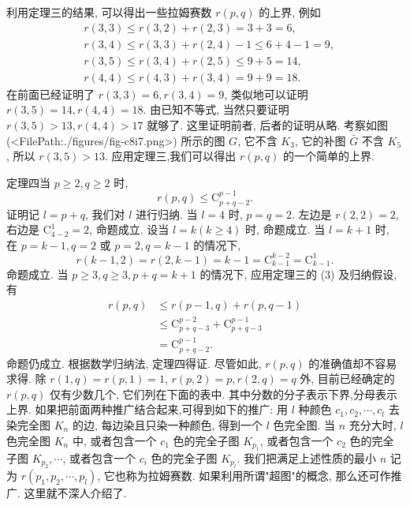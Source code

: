 利用定理三的结果, 可以得出一些拉姆赛数 $r(p, q)$ 的上界, 例如
$$
\begin{aligned}
& r(3,3) \leqslant r(3,2)+r(2,3)=3+3=6, \\
& r(3,4) \leqslant r(3,3)+r(2,4)-1 \leqslant 6+4-1=9, \\
& r(3,5) \leqslant r(3,4)+r(2,5) \leqslant 9+5=14, \\
& r(4,4) \leqslant r(4,3)+r(3,4)=9+9=18 .
\end{aligned}
$$
在前面已经证明了 $r(3,3)=6, r(3,4)=9$, 类似地可以证明 $r(3,5)=14, r(4,4)=18$. 由已知不等式, 当然只要证明 $r(3,5)>13, r(4,4)>17$ 就够了.
这里证明前者, 后者的证明从略.
考察如图(<FilePath:./figures/fig-c8i7.png>) 所示的图 $G$, 它不含 $K_3$, 它的补图 $\bar{G}$ 不含 $K_5$, 所以 $r(3,5)>13$.
应用定理三,我们可以得出 $r(p, q)$ 的一个简单的上界.



定理四当 $p \geqslant 2, q \geqslant 2$ 时,
$$
r(p, q) \leqslant \mathrm{C}_{p+q-2}^{p-1} .
$$
证明记 $l=p+q$, 我们对 $l$ 进行归纳.
当 $l=4$ 时, $p=q=2$. 左边是 $r(2,2)=2$, 右边是 $\mathrm{C}_{4-2}^1=2$, 命题成立.
设当 $l=k(k \geqslant 4)$ 时, 命题成立.
当 $l=k+1$ 时, 在 $p=k-1, q=2$ 或 $p=2, q=k-1$ 的情况下,
$$
r(k-1,2)=r(2, k-1)=k-1=\mathrm{C}_{k-1}^{k-2}=\mathrm{C}_{k-1}^1 .
$$
命题成立.
当 $p \geqslant 3, q \geqslant 3, p+q=k+1$ 的情况下, 应用定理三的 (3) 及归纳假设,有
$$
\begin{aligned}
r(p, q) & \leqslant r(p-1, q)+r(p, q-1) \\
& \leqslant \mathrm{C}_{p+q-3}^{p-2}+\mathrm{C}_{p+q-3}^{p-1} \\
& =\mathrm{C}_{p+q-2}^{p-1} .
\end{aligned}
$$
命题仍成立.
根据数学归纳法, 定理四得证.
尽管如此, $r(p, q)$ 的准确值却不容易求得.
除 $r(1, q)=r(p, 1)=1$, $r(p, 2)=p, r(2, q)=q$ 外, 目前已经确定的 $r(p, q)$ 仅有少数几个, 它们列在下面的表中.
其中分数的分子表示下界,分母表示上界.
如果把前面两种推广结合起来,可得到如下的推广:
用 $l$ 种颜色 $c_1, c_2, \cdots, c_l$ 去染完全图 $K_n$ 的边, 每边染且只染一种颜色, 得到一个 $l$ 色完全图.
当 $n$ 充分大时, $l$ 色完全图 $K_n$ 中, 或者包含一个 $c_1$ 色的完全子图 $K_{p_1}$, 或者包含一个 $c_2$ 色的完全子图 $K_{p_2}, \cdots$, 或者包含一个 $c_i$ 色的完全子图 $K_{p_l}$. 我们把满足上述性质的最小 $n$ 记为 $r\left(p_1, p_2, \cdots, p_l\right)$, 它也称为拉姆赛数.
如果利用所谓"超图"的概念, 那么还可作推广.
这里就不深人介绍了.



